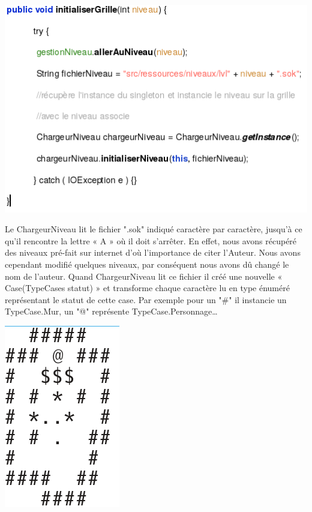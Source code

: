 \documentclass[a4paper,12pt]{article} %
\begin{document}
\begin{center} \includegraphics[scale=1]{code2.png} \end{center}
\newpage
Le ChargeurNiveau lit le fichier ".sok" indiqué caractère par caractère, jusqu’à ce qu’il rencontre la lettre « A » où il doit s’arrêter. En effet, nous avons récupéré des niveaux pré-fait sur internet d’où l’importance de citer l’Auteur. Nous avons cependant modifié quelques niveaux, par conséquent nous avons dû changé le nom de l’auteur. Quand ChargeurNiveau lit ce fichier il créé une nouvelle « Case(TypeCases statut) » et transforme chaque caractère lu en type énuméré représentant le statut de cette case. Par exemple pour un "\#" il instancie un TypeCase.Mur, un "@"  représente TypeCase.Personnage…
\newline
\begin{center} \includegraphics[scale=1]{code3.png} \end{center}
\end{document}
